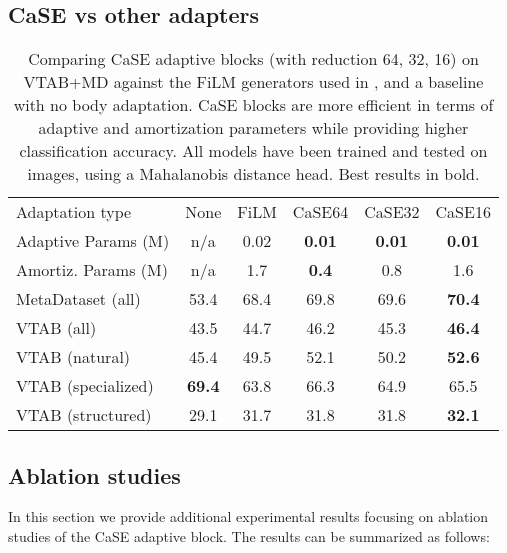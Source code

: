 \documentclass{article}
\begin{document}
\subsection{CaSE vs other adapters} \label{appendix:ssec_case_vs_adapters}

\begin{table}[H]
\caption{Comparing CaSE adaptive blocks (with reduction 64, 32, 16) on VTAB+MD against the FiLM generators used in \cite{bronskill2021memory}, and a baseline with no body adaptation. CaSE blocks are more efficient in terms of adaptive and amortization parameters while providing higher classification accuracy. All models have been trained and tested on  images, using a Mahalanobis distance head. Best results in bold.}
\vskip 0.15in
\begin{center}
\begin{tabular}{lccccc}
\toprule
Adaptation type & None & FiLM & CaSE64 & CaSE32 & CaSE16 \\
Adaptive Params (M) & n/a & 0.02 & \textbf{0.01} & \textbf{0.01} & \textbf{0.01} \\
Amortiz. Params (M) & n/a & 1.7 & \textbf{0.4} & 0.8 & 1.6\\
\midrule
MetaDataset (all) & 53.4 & 68.4 & 69.8 & 69.6 & \textbf{70.4}\\
VTAB (all) & 43.5 & 44.7 & 46.2 & 45.3 & \textbf{46.4}\\
VTAB (natural) & 45.4 & 49.5 & 52.1 & 50.2 & \textbf{52.6}\\
VTAB (specialized) & \textbf{69.4} & 63.8 & 66.3 & 64.9 & 65.5\\
VTAB (structured) & 29.1 & 31.7 & 31.8 & 31.8 & \textbf{32.1}\\
\bottomrule
\end{tabular}
\end{center}
\vskip -0.1in
\end{table}


\subsection{Ablation studies} \label{appendix:ssec_ablation}

In this section we provide additional experimental results focusing on ablation studies of the CaSE adaptive block. The results can be summarized as follows:
\end{document}

